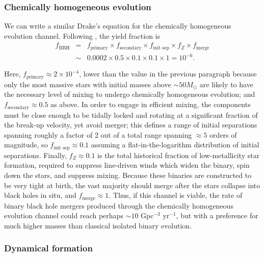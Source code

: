 \documentclass[iop,onecolumn]{revtex4-1}
\begin{document}
\subsubsection{Chemically homogeneous evolution}

We can write a similar Drake's equation for the chemically homogeneous evolution channel.  Following \citet{MandeldeMink:2016},  the yield fraction is
\begin{eqnarray}
f_\textrm{BBH} &=& f_\textrm{primary} \times f_\textrm{secondary} \times f_\textrm{init sep} \times f_Z \times f_\textrm{merge} \nonumber \\
 & \sim & 0.0002 \times 0.5 \times 0.1 \times 0.1 \times 1 = 10^{-6}.
\end{eqnarray}

Here, $f_\textrm{primary} \approx 2 \times 10^{-4}$, lower than the value in the previous paragraph because only the most massive stars with initial masses above $\sim 50 M_\odot$ are likely to have the necessary level of mixing to undergo chemically homogeneous evolution; and $f_\textrm{secondary} \approx 0.5$ as above.  In order to engage in efficient mixing, the components must be close enough to be tidally locked and rotating at a significant fraction of the break-up velocity, yet avoid merger; this defines a range of initial separations spanning roughly a factor of 2 out of a total range spanning $\approx 5$ orders of magnitude, so $f_\textrm{init sep} \approx 0.1$ assuming a flat-in-the-logarithm distribution of initial separations.  Finally, $f_Z \approx 0.1$ is the total historical fraction of low-metallicity star formation, required to suppress line-driven winds which widen the binary, spin down the stars, and suppress mixing.  Because these binaries are constructed to be very tight at birth, the vast majority should merge after the stars collapse into black holes in situ, and $f_\textrm{merge} \approx 1$. Thus, if this channel is viable, the rate of binary black hole mergers produced through the chemically homogeneous evolution channel could reach perhaps $\sim 10$ Gpc$^{-3}$ yr$^{-1}$, but with a preference for much higher masses than classical isolated binary evolution.


\subsubsection{Dynamical formation}
\end{document}
